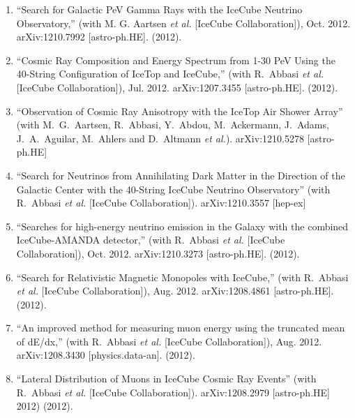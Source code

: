 \begin{enumerate}
\item ``Search for Galactic PeV Gamma Rays with the IceCube
        Neutrino Observatory,'' (with M. G. Aartsen {\it et
        al.}  [IceCube Collaboration]), Oct. 2012.
        arXiv:1210.7992 [astro-ph.HE]. (2012).

\item ``Cosmic Ray Composition and Energy Spectrum from 1-30
        PeV Using the 40-String Configuration of IceTop and
        IceCube,'' (with R.~Abbasi {\it et al.}  [IceCube
        Collaboration]), Jul. 2012.   arXiv:1207.3455
        [astro-ph.HE]. (2012).

\item ``Observation of Cosmic Ray Anisotropy with the IceTop
        Air Shower   Array'' (with M.~G.~Aartsen, R.~Abbasi,
        Y.~Abdou, M.~Ackermann,   J.~Adams, J.~A.~Aguilar,
        M.~Ahlers and D.~Altmann {\it et al.}).
        arXiv:1210.5278 [astro-ph.HE]  %

\item ``Search for Neutrinos from Annihilating Dark Matter
        in the Direction   of the Galactic Center with the
        40-String IceCube Neutrino   Observatory'' (with
        R.~Abbasi {\it et al.}  [IceCube Collaboration]).
        arXiv:1210.3557 [hep-ex]    %

\item ``Searches for high-energy neutrino emission in the
        Galaxy with the combined IceCube-AMANDA detector,''
        (with R.~Abbasi {\it et al.}  [IceCube
        Collaboration]), Oct. 2012.   arXiv:1210.3273
        [astro-ph.HE]. (2012).

\item ``Search for Relativistic Magnetic Monopoles with
        IceCube,'' (with R.~Abbasi {\it et al.}  [IceCube
        Collaboration]), Aug. 2012.   arXiv:1208.4861
        [astro-ph.HE]. (2012).

\item ``An improved method for measuring muon energy using
        the truncated mean of dE/dx,'' (with R.~Abbasi {\it
        et al.}  [IceCube Collaboration]), Aug. 2012.
        arXiv:1208.3430 [physics.data-an]. (2012).

\item ``Lateral Distribution of Muons in IceCube Cosmic Ray
        Events'' (with R.~Abbasi {\it et al.}  [IceCube
        Collaboration]). arXiv:1208.2979 [astro-ph.HE] %
        2012)  (2012).


\end{enumerate}
